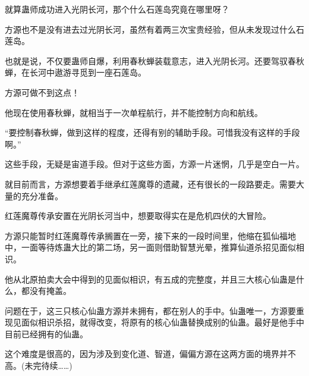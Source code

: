 \begin{this_body}
就算蛊师成功进入光阴长河，那个什么石莲岛究竟在哪里呀？

方源也不是没有进去过光阴长河，虽然有着两三次宝贵经验，但从未发现过什么石莲岛。

也就是说，不仅要蛊师自爆，利用春秋蝉装载意志，进入光阴长河。还要驾驭春秋蝉，在长河中遨游寻觅到一座石莲岛。

方源可做不到这点！

他现在使用春秋蝉，就相当于一次单程航行，并不能控制方向和航线。

“要控制春秋蝉，做到这样的程度，还得有别的辅助手段。可惜我没有这样的手段啊。”

这些手段，无疑是宙道手段。但对于这些方面，方源一片迷惘，几乎是空白一片。

就目前而言，方源想要着手继承红莲魔尊的遗藏，还有很长的一段路要走。需要大量的充分准备。

红莲魔尊传承安置在光阴长河当中，想要取得实在是危机四伏的大冒险。

方源只能暂时红莲魔尊传承搁置在一旁，接下来的一段时间里，他缩在狐仙福地中，一面等待炼蛊大比的第二场，另一面则借助智慧光晕，推算仙道杀招见面似相识。

他从北原拍卖大会中得到的见面似相识，有五成的完整度，并且三大核心仙蛊是什么，都没有掩盖。

问题在于，这三只核心仙蛊方源并未拥有，都在别人的手中。仙蛊唯一，方源要重现见面似相识杀招，就得改变，将原有的核心仙蛊替换成别的仙蛊。最好是他手中目前已经拥有的仙蛊。

这个难度是很高的，因为涉及到变化道、智道，偏偏方源在这两方面的境界并不高。(未完待续……)

\end{this_body}

